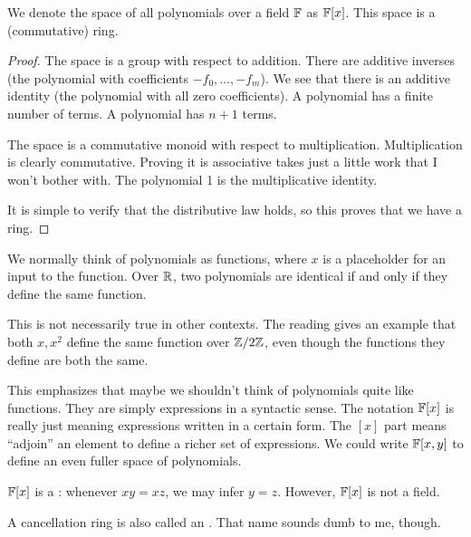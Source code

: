 \begin{proposition}
  We denote the space of all polynomials over a field $\mathbb{F}$ as
  $\mathbb{F}[x]$. This space is a (commutative) ring.
\end{proposition}

\begin{proof}
  The space is a group with respect to addition. There are additive
  inverses (the polynomial with coefficients $-f_0, \ldots, -f_m$). We
  see that there is an additive identity (the polynomial with all zero
  coefficients). A polynomial has a finite number of terms. A
   polynomial has $n+1$ terms.

  The space is a commutative monoid with respect to multiplication.
  Multiplication is clearly commutative. Proving it is associative takes
  just a little work that I won't bother with. The polynomial 1 is the
  multiplicative identity.

  It is simple to verify that the distributive law holds, so this proves
  that we have a ring.
\end{proof}

\begin{remark}
  We normally think of polynomials as functions, where $x$ is a
  placeholder for an input to the function. Over $\mathbb{R}$, two polynomials
  are identical if and only if they define the same function.

  This is not necessarily true in other contexts. The reading gives an
  example that both $x, x^2$ define the same function over $\mathbb{Z} / 2\mathbb{Z}$,
  even though the functions they define are both the same.

  This emphasizes that maybe we shouldn't think of polynomials quite
  like functions. They are simply expressions in a syntactic sense. The
  notation $\mathbb{F}[x]$ is really just meaning expressions written in a
  certain form. The $[x]$ part means ``adjoin'' an element to define a
  richer set of expressions. We could write $\mathbb{F}[x, y]$ to define an
  even fuller space of polynomials.
\end{remark}

\begin{proposition}
  $\mathbb{F}[x]$ is a : whenever $xy = xz$, we may
  infer $y = z$. However, $\mathbb{F}[x]$ is not a field.

  A cancellation ring is also called an . That
  name sounds dumb to me, though.
\end{proposition}

